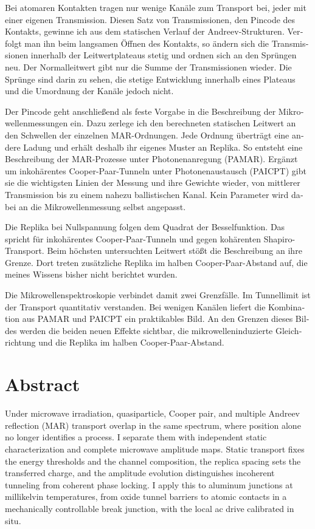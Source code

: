 \begin{otherlanguage}{ngerman}
    Bei atomaren Kontakten tragen nur wenige Kanäle zum Transport bei, jeder mit einer eigenen Transmission. Diesen Satz von Transmissionen, den Pincode des Kontakts, gewinne ich aus dem statischen Verlauf der Andreev-Strukturen. Verfolgt man ihn beim langsamen Öffnen des Kontakts, so ändern sich die Transmissionen innerhalb der Leitwertplateaus stetig und ordnen sich an den Sprüngen neu. Der Normalleitwert gibt nur die Summe der Transmissionen wieder. Die Sprünge sind darin zu sehen, die stetige Entwicklung innerhalb eines Plateaus und die Umordnung der Kanäle jedoch nicht.

    Der Pincode geht anschlie\ss end als feste Vorgabe in die Beschreibung der Mikrowellenmessungen ein. Dazu zerlege ich den berechneten statischen Leitwert an den Schwellen der einzelnen MAR-Ordnungen. Jede Ordnung überträgt eine andere Ladung und erhält deshalb ihr eigenes Muster an Replika. So entsteht eine Beschreibung der MAR-Prozesse unter Photonenanregung (PAMAR). Ergänzt um inkohärentes Cooper-Paar-Tunneln unter Photonenaustausch (PAICPT) gibt sie die wichtigsten Linien der Messung und ihre Gewichte wieder, von mittlerer Transmission bis zu einem nahezu ballistischen Kanal. Kein Parameter wird dabei an die Mikrowellenmessung selbst angepasst.

    Die Replika bei Nullspannung folgen dem Quadrat der Besselfunktion. Das spricht für inkohärentes Cooper-Paar-Tunneln und gegen kohärenten Shapiro-Transport. Beim höchsten untersuchten Leitwert stö\ss t die Beschreibung an ihre Grenze. Dort treten zusätzliche Replika im halben Cooper-Paar-Abstand auf, die meines Wissens bisher nicht berichtet wurden.

    Die Mikrowellenspektroskopie verbindet damit zwei Grenzfälle. Im Tunnellimit ist der Transport quantitativ verstanden. Bei wenigen Kanälen liefert die Kombination aus PAMAR und PAICPT ein praktikables Bild. An den Grenzen dieses Bildes werden die beiden neuen Effekte sichtbar, die mikrowelleninduzierte Gleichrichtung und die Replika im halben Cooper-Paar-Abstand.
\end{otherlanguage}


\newpage
\section*{Abstract}
    Under microwave irradiation, quasiparticle, Cooper pair, and multiple Andreev reflection (MAR) transport overlap in the same spectrum, where position alone no longer identifies a process. I separate them with independent static characterization and complete microwave amplitude maps. Static transport fixes the energy thresholds and the channel composition, the replica spacing sets the transferred charge, and the amplitude evolution distinguishes incoherent tunneling from coherent phase locking. I apply this to aluminum junctions at millikelvin temperatures, from oxide tunnel barriers to atomic contacts in a mechanically controllable break junction, with the local ac drive calibrated in situ.
    
